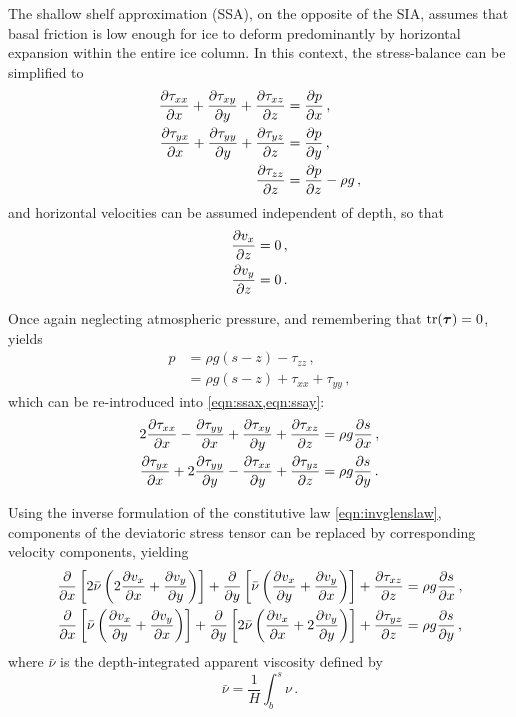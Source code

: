 \documentclass{article}
\newcommand{\tens}[1]{\vb*{#1}} %
\newcommand{\DST}[0]{\tens{\tau}}       %
\begin{document}
The shallow shelf approximation (SSA), on the opposite of the SIA, assumes that
basal friction is low enough for ice to deform predominantly by horizontal
expansion within the entire ice column. In this context, the stress-balance can
be simplified to
\begin{subequations}
\label{eqn:ssa}
\begin{align}
    \label{eqn:ssax}
    \pdv{\tau_{xx}}{x} + \pdv{\tau_{xy}}{y} + \pdv{\tau_{xz}}{z}
        &= \pdv{p}{x} \,, \\
    \label{eqn:ssay}
    \pdv{\tau_{yx}}{x} + \pdv{\tau_{yy}}{y} + \pdv{\tau_{yz}}{z}
        &= \pdv{p}{y} \,, \\
    \label{eqn:ssaz}
    \pdv{\tau_{zz}}{z} &= \pdv{p}{z} - \rho g \,,
\end{align}
\end{subequations}
and horizontal velocities can be assumed independent of depth, so that
\begin{align}
    \pdv{v_x}{z} &= 0 \,, \\
    \pdv{v_y}{z} &= 0 \,.
\end{align}

Once again neglecting atmospheric pressure, and remembering that $\tr(\DST)=0$,
 yields
\begin{align}
    p &= \rho g (s-z) - \tau_{zz} \,, \\
      &= \rho g (s-z) + \tau_{xx} + \tau_{yy} \,,
\end{align}
which can be re-introduced into \cref{eqn:ssax,eqn:ssay}:
\begin{subequations}
\begin{align}
    2\pdv{\tau_{xx}}{x} - \pdv{\tau_{yy}}{x} + \pdv{\tau_{xy}}{y}
        + \pdv{\tau_{xz}}{z} &= \rho g \pdv{s}{x} \,, \\
    \pdv{\tau_{yx}}{x} + 2\pdv{\tau_{yy}}{y} - \pdv{\tau_{xx}}{y}
        + \pdv{\tau_{yz}}{z} &= \rho g \pdv{s}{y} \,.
\end{align}
\end{subequations}

Using the inverse formulation of the constitutive law \eqref{eqn:invglenslaw},
components of the deviatoric stress tensor can be replaced by corresponding
velocity components, yielding
\begin{subequations}
\begin{align}
    \pdv{x} \left[2\bar{\nu}
                  \left(2\pdv{v_x}{x} + \pdv{v_y}{y}\right) \right]
        + \pdv{y} \left[\bar{\nu}
                        \left(\pdv{v_x}{y} + \pdv{v_y}{x}\right) \right]
        + \pdv{\tau_{xz}}{z} &= \rho g \pdv{s}{x} \,, \\
    \pdv{x} \left[\bar{\nu}
                  \left(\pdv{v_x}{y} + \pdv{v_y}{x}\right) \right]
        + \pdv{y} \left[2\bar{\nu}
                        \left(\pdv{v_x}{x} + 2\pdv{v_y}{y}\right) \right]
         + \pdv{\tau_{yz}}{z} &= \rho g \pdv{s}{y} \,,
\end{align}
\end{subequations}
where $\bar{\nu}$ is the depth-integrated apparent viscosity defined by
\begin{equation}
    \bar{\nu} = \frac{1}{H}\int_b^s\nu \,.
\end{equation}
\end{document}
